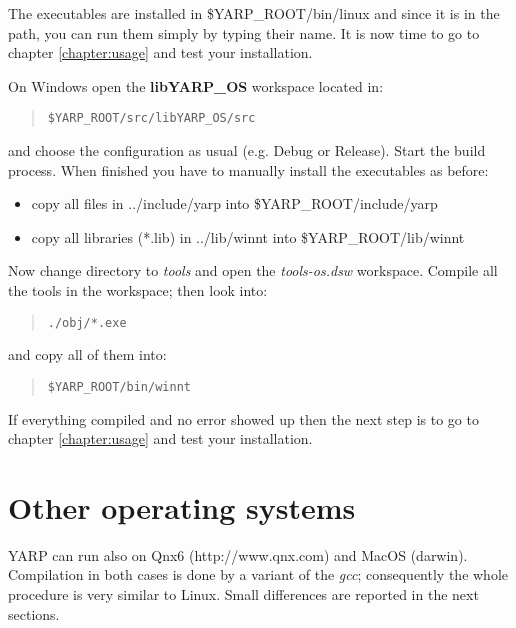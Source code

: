 The executables are installed in \$YARP\_ROOT/bin/linux and since it is in the path, you can run them simply by typing their name. It is now time to go to chapter \ref{chapter:usage} and test your installation. 

\vspace{.5cm}
On Windows open the {\bf libYARP\_OS} workspace located in:

\begin{quote}
{\tt \$YARP\_ROOT/src/libYARP\_OS/src}
\end{quote}

\noindent and choose the configuration as usual (e.g. Debug or Release). Start the build process. When finished you have to manually install the executables as before:

\begin{itemize}
\item copy all files in ../include/yarp into \$YARP\_ROOT/include/yarp
\item copy all libraries (*.lib) in ../lib/winnt into \$YARP\_ROOT/lib/winnt
\end{itemize}

Now change directory to {\em tools} and open the {\em tools-os.dsw} workspace. Compile all the tools in the workspace; then look into:

\begin{quote}
{\tt ./obj/*.exe}
\end{quote}

\noindent and copy all of them into:

\begin{quote}
{\tt \$YARP\_ROOT/bin/winnt}
\end{quote}

If everything compiled and no error showed up then the next step is to go to chapter \ref{chapter:usage} and test your installation. 

\section{Other operating systems}
YARP can run also on Qnx6 (http://www.qnx.com) and MacOS (darwin). Compilation in both cases is done by a variant of the {\em gcc}; consequently the whole procedure is very similar to Linux. Small differences are reported in the next sections.

